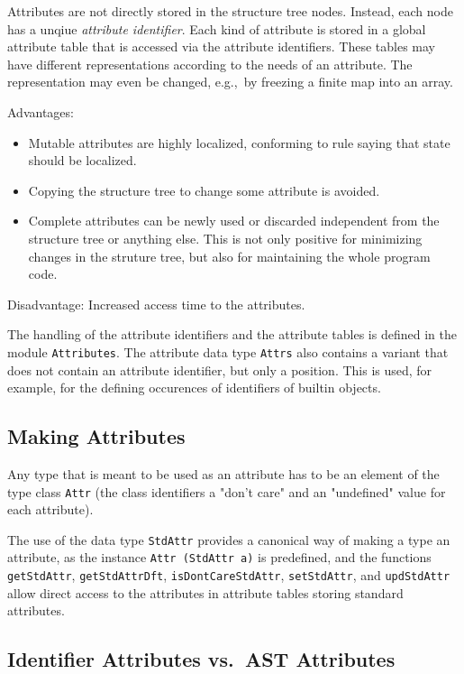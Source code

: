 \documentclass{report}
\newcommand{\code}[1]{\texttt{#1}}
\begin{document}
Attributes are not directly stored in the structure tree nodes. Instead, each
node has a unqiue \emph{attribute identifier}. Each kind of attribute is stored
in a global attribute table that is accessed via the attribute
identifiers. These tables may have different representations according to the
needs of an attribute. The representation may even be changed, e.g.,\ by
freezing a finite map into an array.

Advantages:
%
\begin{itemize}
\item Mutable attributes are highly localized, conforming to rule saying that
  state should be localized.
\item Copying the structure tree to change some attribute is avoided.
\item Complete attributes can be newly used or discarded independent from the
  structure tree or anything else. This is not only positive for minimizing
  changes in the struture tree, but also for maintaining the whole program
  code.
\end{itemize}

Disadvantage: Increased access time to the attributes.

The handling of the attribute identifiers and the attribute tables is defined
in the module \code{Attributes}.  The attribute data type \code{Attrs} also
contains a variant that does not contain an attribute identifier, but only a
position.  This is used, for example, for the defining occurences of
identifiers of builtin objects.

\subsection{Making Attributes}

Any type that is meant to be used as an attribute has to be an element of the
type class \code{Attr} (the class identifiers a "don't care" and an
"undefined" value for each attribute).

The use of the data type \code{StdAttr} provides a canonical way of making a
type an attribute, as the instance \code{Attr (StdAttr a)} is predefined, and
the functions \code{getStdAttr}, \code{getStdAttrDft},
\code{isDontCareStdAttr}, \code{setStdAttr}, and \code{updStdAttr} allow
direct access to the attributes in attribute tables storing standard
attributes. 

\subsection{Identifier Attributes vs.\ AST Attributes}
\end{document}
